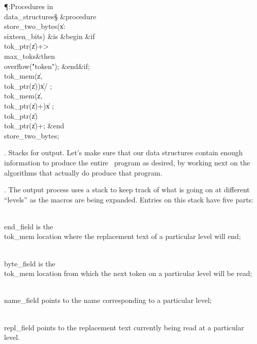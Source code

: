 \Y\P\?\4:Procedures in \\{data\_structures}\X\mathrel{+}\S\?\6
\&{procedure}\8\1\\{store\_two\_bytes}\?(\1\?\|x\?:\?\\{sixteen\_bits}\?\2)\?\2%
\8\&{is}\8\1\6
\4\&{begin}\6
\&{if}\1\1\8\\{tok\_ptr}\?\1(\?\|z\?\2)+\?>\?\\{max\_toks}\2\8\&{then}\6
\\{overflow}\?\1(\?\.{"token"}\?\2)\?;\2\6
\&{end}\8\2\&{if}\1;\6
\\{tok\_mem}\?\1(\?\|z\?,\?\\{tok\_ptr}\?\1(\?\|z\?\2)\2)\K\?\|x\?/%
\?;\6
\\{tok\_mem}\?\1(\?\|z\?,\?\\{tok\_ptr}\?\1(\?\|z\?\2)+\?\2)\K\?\|x\?%
\?;\6
\\{tok\_ptr}\?\1(\?\|z\?\2)\K\?\\{tok\_ptr}\?\1(\?\|z\?\2)+;\2\6
\&{end}\8\\{store\_two\_bytes};\par
\fi

.  Stacks for output.
Let's make sure that our data structures contain enough information to
produce the entire \ADA\ program as desired, by working next on the
algorithms that actually do produce that program.

\fi

. The output process uses a stack to keep track of what is going on at
different ``levels'' as the macros are being expanded.
Entries on this stack have five parts:

\yskip\hang \\{end\_field} is the \\{tok\_mem} location where the replacement
text of a particular level will end;

\hang \\{byte\_field} is the \\{tok\_mem} location from which the next token
on a particular level will be read;

\hang \\{name\_field} points to the name corresponding to a particular level;

\hang \\{repl\_field} points to the replacement text currently being read
at a particular level.

